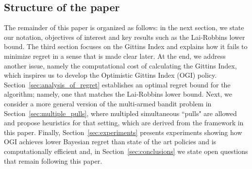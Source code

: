 \subsection{Structure of the paper}
The remainder of this paper is organized as follows: in the next section, we state our notation, objectives of interest 
and key results such as the Lai-Robbins lower bound. The third section focuses on the Gittins Index and explains how it fails to minimize regret in a sense that is made clear later. At the end, we address another issue, namely the computational cost of calculating the Gittins Index, which inspires us to develop the Optimistic Gittins Index (OGI) policy. Section~\ref{sec:analysis_of_regret} establishes an optimal regret bound for the algorithm; namely, one that matches the Lai-Robbins lower bound. Next, we consider a more general version of the multi-armed bandit problem in Section~\ref{sec:multiple_pulls}, where multipled simultaneous ``pulls" are allowed and propose heuristics for that setting, which are derived from the framework in this paper. Finally, Section~\ref{sec:experiments} presents experiments showing how OGI achieves lower Bayesian regret than state of the art policies and is computationally efficient and, in Section~\ref{sec:conclusions} we state open questions that remain following this paper.
